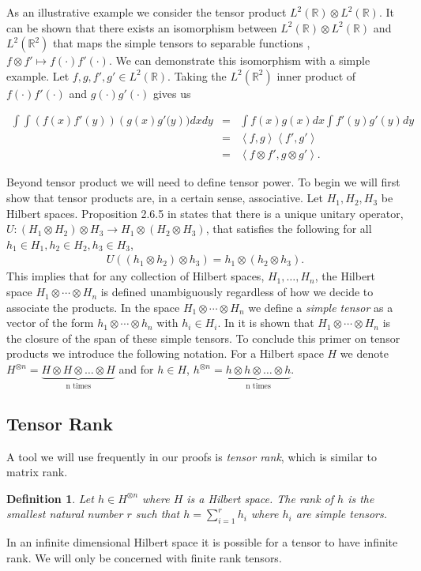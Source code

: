 \documentclass[aos,preprint]{imsart}
\def\rn{\mathbb{R}}
\def\l{\left}
\def\r{\right}
\theoremstyle{plain}
\theoremstyle{defintion}
\newtheorem{defin}{Definition}[section]
\begin{document}
	As an illustrative example we consider the tensor product $L^2\left( \rn \right) \otimes L^2\left( \rn \right)$. It can be shown that there exists an isomorphism between $L^2\left( \rn \right) \otimes L^2\left( \rn \right)$ and $L^2(\rn^2)$ that maps the simple tensors to separable functions \cite{kadison83}, $f \otimes f' \mapsto f(\cdot)f'(\cdot)$. We can demonstrate this isomorphism with a simple example. Let $f,g,f',g'\in L^2\left( \rn \right)$. Taking the $L^2(\rn^2)$ inner product of $f(\cdot)f'(\cdot)$ and $g(\cdot)g'(\cdot)$ gives us 

	\begin{eqnarray*}
		\int\int \l(f(x)f'(y)\r)\l(g(x)g'(y\r)) dx dy 
		&=& \int f(x)g(x) dx \int f'(y)g'(y) dy\\
	 &=& \l<f,g\r>  \l<f',g'\r>\\
	 &=& \l<f\otimes f', g \otimes g'\r>.
	\end{eqnarray*}

	Beyond tensor product we will need to define tensor power. To begin we will first show that tensor products are, in a certain sense, associative. Let $H_1, H_2, H_3$ be Hilbert spaces. Proposition 2.6.5 in \cite{kadison83} states that there is a unique unitary operator, $U: (H_1 \otimes H_2)\otimes H_3 \to H_1 \otimes (H_2 \otimes H_3)$, that satisfies the following for all $h_1 \in H_1, h_2 \in H_2, h_3 \in H_3$,
	\begin{eqnarray*}
		U\left( \left( h_1 \otimes h_2 \right)\otimes h_3 \right) = h_1 \otimes \left( h_2 \otimes h_3 \right).
	\end{eqnarray*}
        This implies that for any collection of Hilbert spaces, $H_1,\ldots , H_n$, the Hilbert space $H_1 \otimes \cdots \otimes H_n$ is defined unambiguously regardless of how we decide to associate the products. In the space $H_1 \otimes \cdots \otimes H_n$ we define a {\it simple tensor} as a vector of the form $h_1 \otimes\cdots\otimes h_n$ with $h_i \in H_i$. In \cite{kadison83} it is shown that $H_1 \otimes\cdots \otimes H_n$ is the closure of the span of these simple tensors. To conclude this primer on tensor products we introduce the following notation. For a Hilbert space $H$ we denote $H^{\otimes n}= \underbrace{H\otimes H \otimes \dots \otimes H}_\text{n times}$ and for $h \in H$, $h^{\otimes n}= \underbrace{h\otimes h \otimes \dots \otimes h}_\text{n times}$.
	\subsection{Tensor Rank}
	A tool we will use frequently in our proofs is {\em tensor rank}, which is similar to matrix rank.
	\begin{defin} \label{def:tensrank}
		Let $h\in H^{\otimes n}$ where $H$ is a Hilbert space. The {\em rank} of $h$ is the smallest natural number $r$ such that $h =\sum_{i=1}^r h_i$ where $h_i$ are simple tensors.
	\end{defin}
	In an infinite dimensional Hilbert space it is possible for a tensor to have infinite rank. We will only be concerned with finite rank tensors.
\end{document}
